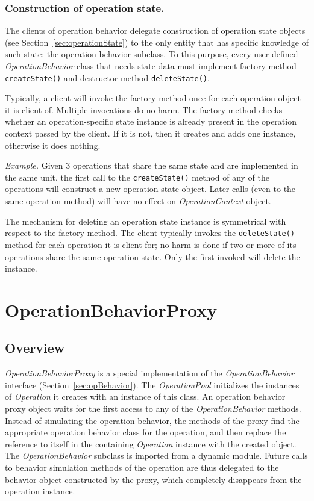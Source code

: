 \documentclass[a4paper,twoside]{tce}
\begin{document}
\subsubsection{Construction of operation state.}
The clients of operation behavior delegate construction of operation state
objects (see Section~\ref{sec:operationState}) to the only entity that has
specific knowledge of such state: the operation behavior subclass.  To this
purpose, every user defined \emph{OperationBehavior} class that needs state
data must implement factory method \verb|createState()| and destructor
method \verb|deleteState()|.

Typically, a client will invoke the factory method once for each operation
object it is client of.  Multiple invocations do no harm.  The factory
method checks whether an operation-specific state instance is already
present in the operation context passed by the client.  If it is not, then
it creates and adds one instance, otherwise it does nothing.

\emph{Example.} Given 3 operations that share the same state and are
implemented in the same unit, the first call to the \verb#createState()#
method of any of the operations will construct a new operation state object.
Later calls (even to the same operation method) will have no effect on
\emph{OperationContext} object.

The mechanism for deleting an operation state instance is symmetrical with
respect to the factory method.  The client typically invokes the
\verb|deleteState()| method for each operation it is client for; no harm is
done if two or more of its operations share the same operation state.  Only
the first invoked will delete the instance.


\section{OperationBehaviorProxy}
\label{sec:opBehaviorProxy}

\subsection{Overview}

\emph{OperationBehaviorProxy} is a special implementation of the
\emph{OperationBehavior} interface (Section~\ref{sec:opBehavior}).  The
\emph{OperationPool} initializes the instances of \emph{Operation} it
creates with an instance of this class.  An operation behavior proxy object
waits for the first access to any of the \emph{OperationBehavior} methods.
Instead of simulating the operation behavior, the methods of the proxy find
the appropriate operation behavior class for the operation, and then
replace the reference to itself in the containing \emph{Operation} instance
with the created object.  The \emph{OperationBehavior} subclass is imported
from a dynamic module.  Future calls to behavior simulation methods of the
operation are thus delegated to the behavior object constructed by the
proxy, which completely disappears from the operation instance.
\end{document}
